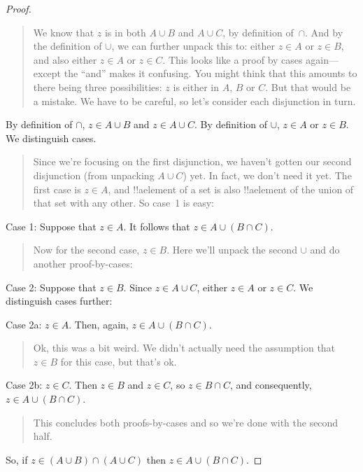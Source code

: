 \documentclass[../../../include/open-logic-section]{subfiles}
\begin{document}
\begin{proof}
\begin{quote}
We know that $z$ is in both $A \cup B$ and $A \cup C$, by definition
of~$\cap$. And by the definition of $\cup$, we can further unpack this
to: either $z \in A$ or $z \in B$, and also either $z \in A$ or $z \in
C$. This looks like a proof by cases again---except the ``and'' makes
it confusing. You might think that this amounts to there being three
possibilities: $z$ is either in $A$, $B$ or $C$. But that would be a
mistake.  We have to be careful, so let's consider each disjunction in
turn.
\end{quote}
By definition of $\cap$, $z \in A \cup B$ and $z \in A \cup C$. By
definition of $\cup$, $z \in A$ or $z \in B$. We distinguish cases.
\begin{quote}
Since we're focusing on the first disjunction, we haven't gotten our
second disjunction (from unpacking $A \cup C$) yet. In fact, we don't
need it yet. The first case is $z \in A$, and !!a{element} of a set is
also !!a{element} of the union of that set with any other. So case~1
is easy:
\end{quote}
Case 1: Suppose that $z \in A$. It follows that $z \in A \cup (B \cap
C)$.
\begin{quote}
Now for the second case, $z \in B$. Here we'll unpack the second
$\cup$ and do another proof-by-cases:
\end{quote}
Case 2: Suppose that $z \in B$. Since $z \in A \cup C$, either $z \in
A$ or $z \in C$. We distinguish cases further:

Case 2a: $z \in A$. Then, again, $z \in A \cup (B \cap C)$.
\begin{quote}
Ok, this was a bit weird. We didn't actually need the assumption
that~$z \in B$ for this case, but that's ok.
\end{quote}
Case 2b: $z \in C$. Then $z \in B$ and $z \in C$, so $z \in B \cap C$,
and consequently, $z \in A \cup (B \cap C)$.
\begin{quote}
This concludes both proofs-by-cases and so we're done with the second
half.
\end{quote}
So, if $z \in (A \cup B) \cap (A \cup C)$ then $z \in A \cup (B \cap C)$.
\end{proof}
\end{document}
